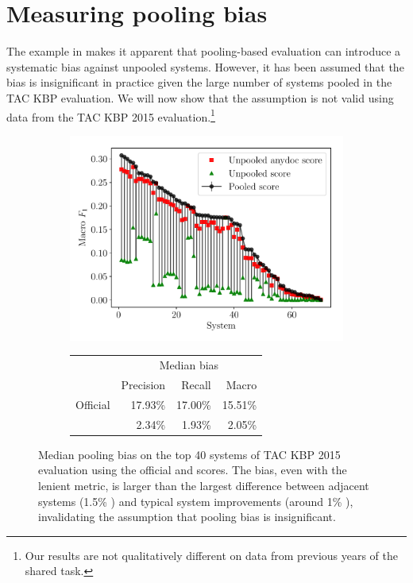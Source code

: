 \section{Measuring pooling bias}
\label{sec:analysis}

The example in  makes it apparent that pooling-based evaluation can introduce a systematic bias against unpooled systems.
However, it has been assumed that the bias is insignificant in practice given the large number of systems pooled in the TAC KBP evaluation.
We will now show that the assumption is not valid using data from the TAC KBP 2015 evaluation.\footnote{%
Our results are not qualitatively different on data from previous years of the shared task.}

\begin{figure}[t]
  \centering
  \begin{subfigure}{\columnwidth}
      \includegraphics[width=\columnwidth]{figures/pooling_bias/pooling_bias}
    \centering
    \small{\begin{tabular} {l r r r} \toprule
                    & \multicolumn{3}{c}{Median bias} \\
                    & Precision & Recall & Macro \fone{} \\ \midrule 
   Official         & 17.93\% &  17.00\% & 15.51\% \\ 
   \anydoc{}        & 2.34\% &  1.93\% & 2.05\% \\ \bottomrule
   \end{tabular}}
  \end{subfigure}
  \caption{\label{fig:pooling-bias} Median pooling bias on the top 40 systems of TAC KBP 2015 evaluation using the official and \anydoc{} scores.
  The bias, even with the lenient \anydoc{} metric, is larger than the largest difference between adjacent systems (1.5\% \fone{}) and typical system improvements (around 1\% \fone{}),
  invalidating the assumption that pooling bias is insignificant.
  }
\end{figure}
